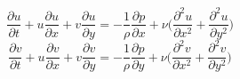 \documentclass[preview]{standalone}
\begin{document}
\begin{equation*}
\frac{\partial u}{\partial t}+u\frac{\partial u}{\partial x}+v\frac{\partial u}{\partial y} = -\frac{1}{\rho}\frac{\partial p}{\partial x}+\nu\Bigg(\frac{\partial^2 u}{\partial x^2}+\frac{\partial^2 u}{\partial y^2}\Bigg)
\end{equation*}
\begin{equation*}
\frac{\partial v}{\partial t}+u\frac{\partial v}{\partial x}+v\frac{\partial v}{\partial y} = -\frac{1}{\rho}\frac{\partial p}{\partial y}+\nu\Bigg(\frac{\partial^2 v}{\partial x^2}+\frac{\partial^2 v}{\partial y^2}\Bigg)
\end{equation*}
\end{document}
